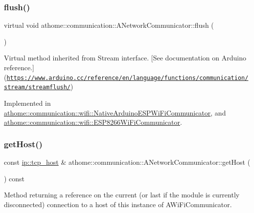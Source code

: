 \subsubsection{\texorpdfstring{flush()}{flush()}}
{\footnotesize\ttfamily virtual void athome\+::communication\+::\+A\+Network\+Communicator\+::flush (\begin{DoxyParamCaption}{ }\end{DoxyParamCaption})\hspace{0.3cm}{\ttfamily [pure virtual]}}

Virtual method inherited from Stream interface. \mbox{[}See documentation on Arduino reference.\mbox{]}(\href{https://www.arduino.cc/reference/en/language/functions/communication/stream/streamflush/}{\tt https\+://www.\+arduino.\+cc/reference/en/language/functions/communication/stream/streamflush/}) 

Implemented in \mbox{\hyperlink{classathome_1_1communication_1_1wifi_1_1_native_arduino_e_s_p_wi_fi_communicator_a5b02865d3bf418d1b4dff8a1198c8dac}{athome\+::communication\+::wifi\+::\+Native\+Arduino\+E\+S\+P\+Wi\+Fi\+Communicator}}, and \mbox{\hyperlink{classathome_1_1communication_1_1wifi_1_1_e_s_p8266_wi_fi_communicator_af95ca7f47285b13fc895e0d9323ee320}{athome\+::communication\+::wifi\+::\+E\+S\+P8266\+Wi\+Fi\+Communicator}}.

\mbox{\label{classathome_1_1communication_1_1_a_network_communicator_a6b52a87191bef07e73ec1bbba0713080}} 
\subsubsection{\texorpdfstring{get\+Host()}{getHost()}}
{\footnotesize\ttfamily const \mbox{\hyperlink{structathome_1_1communication_1_1ip_1_1s__host}{ip\+::tcp\+\_\+host}} \& athome\+::communication\+::\+A\+Network\+Communicator\+::get\+Host (\begin{DoxyParamCaption}{ }\end{DoxyParamCaption}) const}

Method returning a reference on the current (or last if the module is currently disconnected) connection to a host of this instance of A\+Wi\+Fi\+Communicator.

